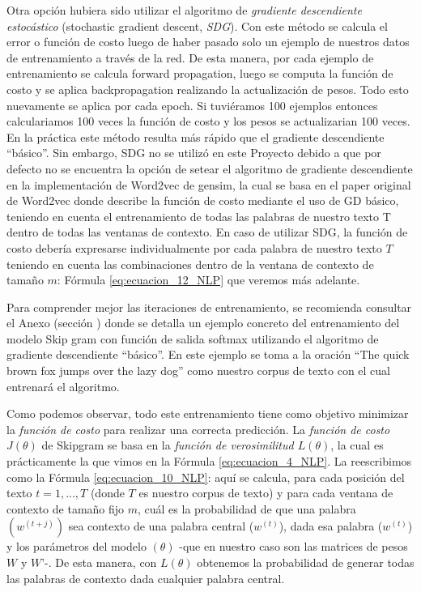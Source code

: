 \documentclass[12pt,a4paper]{article}
\begin{document}
\begin{sloppypar}
Otra opción hubiera sido utilizar el algoritmo de \textit{gradiente descendiente estocástico} (stochastic gradient descent, \textit{SDG}). Con este método se calcula el error o función de costo luego de haber pasado solo un ejemplo de nuestros datos de entrenamiento a través de la red. De esta manera, por cada ejemplo de entrenamiento se calcula forward propagation, luego se computa la función de costo y se aplica backpropagation realizando la actualización de pesos. Todo esto nuevamente se aplica por cada epoch. Si tuviéramos 100 ejemplos entonces calculariamos 100 veces la función de costo y los pesos se actualizarian 100 veces. En la práctica este método resulta más rápido que el gradiente descendiente “básico”.  Sin embargo, SDG no se utilizó en este Proyecto debido a que por defecto no se encuentra la opción de setear el algoritmo de gradiente descendiente en la implementación de Word2vec de gensim, la cual se basa en el paper original de Word2vec\cite{NLP_11} donde describe la función de costo mediante el uso de GD básico, teniendo en cuenta el entrenamiento de todas las palabras de nuestro texto T dentro de todas las ventanas de contexto. En caso de utilizar SDG, la función de costo debería expresarse individualmente por cada palabra de nuestro texto $T$ teniendo en cuenta las combinaciones dentro de la ventana de contexto de tamaño $m$: Fórmula \ref{eq:ecuacion_12_NLP} que veremos más adelante.

Para comprender mejor las iteraciones de entrenamiento, se recomienda consultar el Anexo (sección \textit{}) donde se detalla un ejemplo concreto del entrenamiento del modelo Skip gram con función de salida softmax utilizando el algoritmo de gradiente descendiente “básico”. En este ejemplo se toma a la oración “The quick brown fox jumps over the lazy dog” como nuestro corpus de texto con el cual entrenará el algoritmo.

Como podemos observar, todo este entrenamiento tiene como objetivo minimizar la \textit{función de costo} para realizar una correcta predicción. La \textit{función de costo $J(\theta)$} de Skipgram se basa en la \textit{función de verosimilitud $L(\theta)$}, la cual es prácticamente la que vimos en la Fórmula \ref{eq:ecuacion_4_NLP}. La reescribimos como la Fórmula \ref{eq:ecuacion_10_NLP}: aquí se calcula, para cada posición del texto $t = 1, ..., T$ (donde $T$ es nuestro corpus de texto) y para cada ventana de contexto de tamaño fijo $m$, cuál es la probabilidad de que una palabra $(w^{(t+j)})$ sea contexto de una palabra central ($w^{(t)}$), dada esa palabra ($w^{(t)}$) y los parámetros del modelo $(\theta)$ -que en nuestro caso son las matrices de pesos $W$ y $W’$-. De esta manera, con $L(\theta)$ obtenemos la probabilidad de generar todas las palabras de contexto dada cualquier palabra central.


\end{sloppypar}
\end{document}

